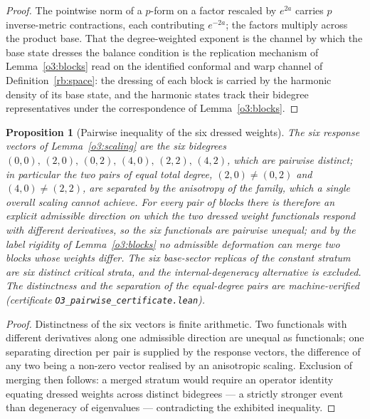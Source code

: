 \documentclass[11pt]{article}
\numberwithin{equation}{section}
\theoremstyle{plain}
\newtheorem{proposition}[theorem]{Proposition}
\theoremstyle{definition}
\theoremstyle{remark}
\begin{document}
\begin{proof}
The pointwise norm of a $p$-form on a factor rescaled by $e^{2a}$
carries $p$ inverse-metric contractions, each contributing
$e^{-2a}$; the factors multiply across the product base. That the
degree-weighted exponent is the channel by which the base state
dresses the balance condition is the replication mechanism of
Lemma~\ref{o3:blocks} read on the identified conformal and warp
channel of Definition~\ref{rb:space}: the dressing of each block is
carried by the harmonic density of its base state, and the harmonic
states track their bidegree representatives under the
correspondence of Lemma~\ref{o3:blocks}.
\end{proof}

\begin{proposition}[Pairwise inequality of the six dressed
weights]\label{o3:pairwise}
The six response vectors of Lemma~\textup{\ref{o3:scaling}} are the
six bidegrees
$(0,0),\, (2,0),\, (0,2),\, (4,0),\, (2,2),\, (4,2)$, which are
pairwise distinct; in particular the two pairs of equal total
degree, $(2,0) \neq (0,2)$ and $(4,0) \neq (2,2)$, are separated by
the anisotropy of the family, which a single overall scaling cannot
achieve. For every pair of blocks there is therefore an explicit
admissible direction on which the two dressed weight functionals
respond with different derivatives, so the six functionals are
pairwise unequal; and by the label rigidity of
Lemma~\textup{\ref{o3:blocks}} no admissible deformation can merge
two blocks whose weights differ. The six base-sector replicas of
the constant stratum are six distinct critical strata, and the
internal-degeneracy alternative is excluded. The distinctness and
the separation of the equal-degree pairs are machine-verified
(certificate \texttt{O3\_pairwise\_certificate.lean}).
\end{proposition}

\begin{proof}
Distinctness of the six vectors is finite arithmetic. Two
functionals with different derivatives along one admissible
direction are unequal as functionals; one separating direction per
pair is supplied by the response vectors, the difference of any two
being a non-zero vector realised by an anisotropic scaling.
Exclusion of merging then follows: a merged stratum would require
an operator identity equating dressed weights across distinct
bidegrees --- a strictly stronger event than degeneracy of
eigenvalues --- contradicting the exhibited inequality.
\end{proof}
\end{document}
